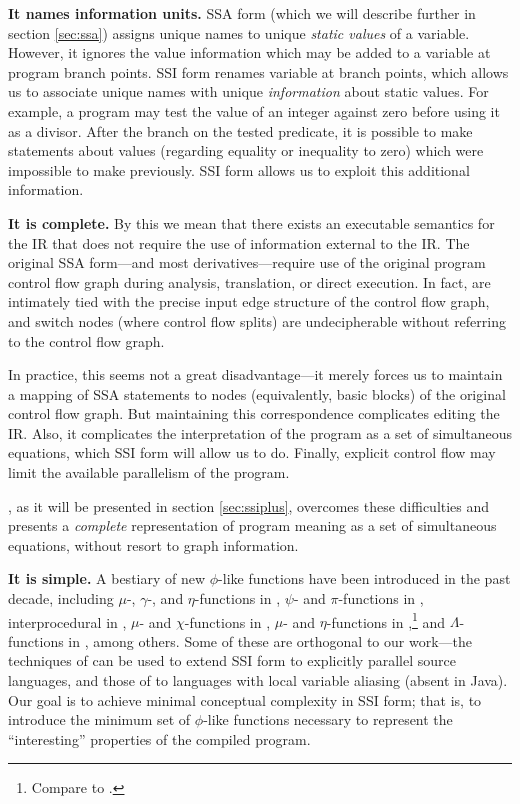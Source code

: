 \documentclass[12pt,titlepage,twoside]{article}
\begin{document}
\textbf{It names information units.}  SSA form (which we will describe
further in section \ref{sec:ssa}) assigns unique names to unique \emph{static
values} of a variable.  However, it ignores the value information
which may be added to a variable at program branch points.  SSI form
renames variable at branch points, which allows us to associate unique names
with unique \emph{information} about static values.  For example, a
program may test the value of an integer against zero before using it
as a divisor.  After the branch on the tested predicate, it is
possible to make statements about values (regarding equality or
inequality to zero) which were impossible to make previously.  SSI
form allows us to exploit this additional information.

\textbf{It is complete.}\label{sec:complete}
By this we mean that there exists an
executable semantics for the IR that does not require the use of
information external to the IR.  The original SSA form---and most
derivatives---require use of the original program control flow graph
during analysis, translation, or direct execution.  In fact,
 are intimately tied with the precise input edge
structure of the control flow graph, and switch nodes (where control
flow splits) are undecipherable without referring to the control flow
graph.

In practice, this seems not a great disadvantage---it merely forces us to
maintain a mapping of SSA statements to nodes (equivalently, basic
blocks) of the original control flow graph.  But maintaining this
correspondence complicates editing the IR.  Also, it complicates the
interpretation of the program as a set of simultaneous equations,
which SSI form will allow us to do.  Finally, explicit control flow
may limit the available parallelism of the program.

\ssiplus, as it will be presented in section \ref{sec:ssiplus},
overcomes these difficulties and presents a \emph{complete}
representation of program meaning as a set of simultaneous equations,
without resort to graph information.

\textbf{It is simple.}  A bestiary of new $\phi$-like functions have
been introduced in the past decade, including
$\mu$-, $\gamma$-, and $\eta$-functions in \cite{ballance90:pdw,tu95:gssa},
$\psi$- and $\pi$-functions in \cite{lee99:parssa},
interprocedural  in \cite{liao99:issa},
$\mu$- and $\chi$-functions in \cite{chow96:hssa},
$\mu$- and $\eta$-functions in \cite{gerlek95:inductssa},\footnote{Compare to
\cite{ballance90:pdw,tu95:gssa}.} and $\Lambda$-functions in \cite{lo98:ssu},
among others.%
Some of these are orthogonal to our work---the techniques of
\cite{lee99:parssa} can be used to extend SSI form to explicitly
parallel source languages, and those of \cite{chow96:hssa} to
languages with local variable aliasing (absent in Java).  Our goal is
to achieve minimal conceptual complexity in SSI form; that is, to
introduce the minimum set of $\phi$-like functions necessary to
represent the ``interesting'' properties of the compiled program.
\end{document}

